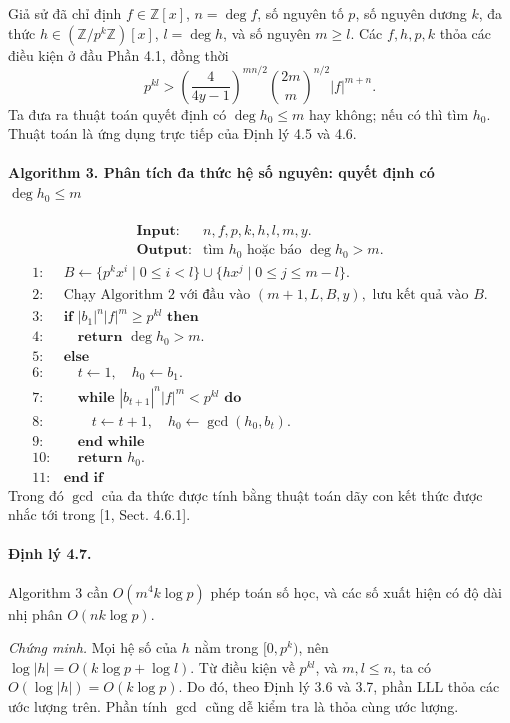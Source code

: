 \documentclass[11pt]{article}
\begin{document}
Giả sử đã chỉ định \(f\in\mathbb Z[x]\), \(n=\deg f\), số nguyên tố \(p\), số
nguyên dương \(k\), đa thức \(h\in(\mathbb Z/p^k\mathbb Z)[x]\),
\(l=\deg h\), và số nguyên \(m\ge l\). Các \(f,h,p,k\) thỏa các điều kiện ở
đầu Phần 4.1, đồng thời
\[
  p^{kl}>
  \left(\frac{4}{4y-1}\right)^{mn/2}
  \binom{2m}{m}^{n/2}
  |f|^{m+n}.
\]
Ta đưa ra thuật toán quyết định có \(\deg h_0\le m\) hay không; nếu có thì
tìm \(h_0\). Thuật toán là ứng dụng trực tiếp của Định lý 4.5 và 4.6.

\paragraph{Algorithm 3. Phân tích đa thức hệ số nguyên: quyết định có \(\deg h_0\le m\)}
\[
\begin{array}{ll}
\textbf{Input:} & n,f,p,k,h,l,m,y.\\
\textbf{Output:} & \text{tìm } h_0 \text{ hoặc báo } \deg h_0>m.
\end{array}
\]
\[
\begin{array}{rl}
1:& B\leftarrow \{p^kx^i\mid 0\le i<l\}\cup\{hx^j\mid 0\le j\le m-l\}.\\
2:& \text{Chạy Algorithm 2 với đầu vào } (m+1,L,B,y), \text{ lưu kết quả vào } B.\\
3:& \textbf{if } |b_1|^n|f|^m\ge p^{kl} \textbf{ then}\\
4:& \quad \textbf{return } \deg h_0>m.\\
5:& \textbf{else}\\
6:& \quad t\leftarrow1,\quad h_0\leftarrow b_1.\\
7:& \quad \textbf{while } |b_{t+1}|^n|f|^m<p^{kl} \textbf{ do}\\
8:& \quad\quad t\leftarrow t+1,\quad h_0\leftarrow \gcd(h_0,b_t).\\
9:& \quad \textbf{end while}\\
10:& \quad \textbf{return } h_0.\\
11:& \textbf{end if}
\end{array}
\]
Trong đó \(\gcd\) của đa thức được tính bằng thuật toán dãy con kết thức được
nhắc tới trong [1, Sect. 4.6.1].

\paragraph{Định lý 4.7.}
Algorithm 3 cần \(O(m^4k\log p)\) phép toán số học, và các số xuất hiện có độ
dài nhị phân \(O(nk\log p)\).

\emph{Chứng minh.}
Mọi hệ số của \(h\) nằm trong \([0,p^k)\), nên \(\log |h|=O(k\log p+\log l)\).
Từ điều kiện về \(p^{kl}\), và \(m,l\le n\), ta có \(O(\log |h|)=O(k\log p)\).
Do đó, theo Định lý 3.6 và 3.7, phần LLL thỏa các ước lượng trên. Phần tính
\(\gcd\) cũng dễ kiểm tra là thỏa cùng ước lượng.
\end{document}
